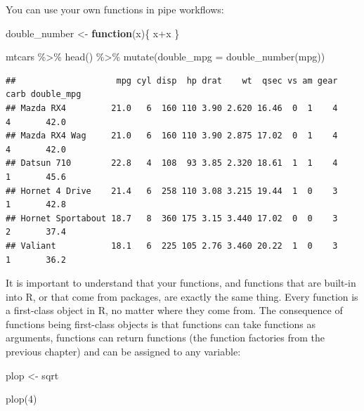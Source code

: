 \documentclass[
]{article}
\newenvironment{Shaded}{\begin{snugshade}}{\end{snugshade}}
\newcommand{\AttributeTok}[1]{\textcolor[rgb]{0.77,0.63,0.00}{#1}}
\newcommand{\ControlFlowTok}[1]{\textcolor[rgb]{0.13,0.29,0.53}{\textbf{#1}}}
\newcommand{\DecValTok}[1]{\textcolor[rgb]{0.00,0.00,0.81}{#1}}
\newcommand{\FunctionTok}[1]{\textcolor[rgb]{0.00,0.00,0.00}{#1}}
\newcommand{\NormalTok}[1]{#1}
\newcommand{\OtherTok}[1]{\textcolor[rgb]{0.56,0.35,0.01}{#1}}
\newcommand{\SpecialCharTok}[1]{\textcolor[rgb]{0.00,0.00,0.00}{#1}}
\begin{document}
You can use your own functions in pipe workflows:

\begin{Shaded}
\begin{Highlighting}[]
\NormalTok{double\_number }\OtherTok{\textless{}{-}} \ControlFlowTok{function}\NormalTok{(x)\{}
\NormalTok{  x}\SpecialCharTok{+}\NormalTok{x}
\NormalTok{\}}
\end{Highlighting}
\end{Shaded}

\begin{Shaded}
\begin{Highlighting}[]
\NormalTok{mtcars }\SpecialCharTok{\%\textgreater{}\%}
  \FunctionTok{head}\NormalTok{() }\SpecialCharTok{\%\textgreater{}\%}
  \FunctionTok{mutate}\NormalTok{(}\AttributeTok{double\_mpg =} \FunctionTok{double\_number}\NormalTok{(mpg))}
\end{Highlighting}
\end{Shaded}

\begin{verbatim}
##                    mpg cyl disp  hp drat    wt  qsec vs am gear carb double_mpg
## Mazda RX4         21.0   6  160 110 3.90 2.620 16.46  0  1    4    4       42.0
## Mazda RX4 Wag     21.0   6  160 110 3.90 2.875 17.02  0  1    4    4       42.0
## Datsun 710        22.8   4  108  93 3.85 2.320 18.61  1  1    4    1       45.6
## Hornet 4 Drive    21.4   6  258 110 3.08 3.215 19.44  1  0    3    1       42.8
## Hornet Sportabout 18.7   8  360 175 3.15 3.440 17.02  0  0    3    2       37.4
## Valiant           18.1   6  225 105 2.76 3.460 20.22  1  0    3    1       36.2
\end{verbatim}

It is important to understand that your functions, and functions that are built-in into R, or that
come from packages, are exactly the same thing. Every function is a first-class object in R, no
matter where they come from. The consequence of functions being first-class objects is that
functions can take functions as arguments, functions can return functions (the function factories
from the previous chapter) and can be assigned to any variable:

\begin{Shaded}
\begin{Highlighting}[]
\NormalTok{plop }\OtherTok{\textless{}{-}}\NormalTok{ sqrt}

\FunctionTok{plop}\NormalTok{(}\DecValTok{4}\NormalTok{)}
\end{Highlighting}
\end{Shaded}
\end{document}
